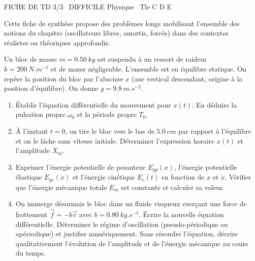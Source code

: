 \documentclass[11pt]{article}
\begin{document}
\begin{tcolorbox}[enhanced,colback=popink,colframe=popink,arc=10pt,boxrule=0pt,left=12pt,right=12pt,top=9pt,bottom=9pt]
{\color{white}\popxbold\small FICHE DE TD 3/3 \textbullet\ DIFFICILE \hfill Physique \textbullet\ Tle C D E\par}
\end{tcolorbox}
\vspace{4pt}
\noindent Cette fiche de synthèse propose des problèmes longs mobilisant l'ensemble des notions du chapitre (oscillateurs libres, amortis, forcés) dans des contextes réalistes ou théoriques approfondis.

\begin{exercice}
Un bloc de masse $m = \SI{0,50}{kg}$ est suspendu à un ressort de raideur $k = \SI{200}{N.m^{-1}}$ et de masse négligeable. L'ensemble est en équilibre statique. On repère la position du bloc par l'abscisse $x$ (axe vertical descendant, origine à la position d'équilibre). On donne $g = \SI{9,8}{m.s^{-2}}$.
\begin{enumerate}
    \item Établir l'équation différentielle du mouvement pour $x(t)$. En déduire la pulsation propre $\omega_0$ et la période propre $T_0$.
    \item À l'instant $t=0$, on tire le bloc vers le bas de $\SI{5,0}{cm}$ par rapport à l'équilibre et on le lâche sans vitesse initiale. Déterminer l'expression horaire $x(t)$ et l'amplitude $X_m$.
    \item Exprimer l'énergie potentielle de pesanteur $E_{pp}(x)$, l'énergie potentielle élastique $E_{pe}(x)$ et l'énergie cinétique $E_c(t)$ en fonction de $x$ et $\dot{x}$. Vérifier que l'énergie mécanique totale $E_m$ est constante et calculer sa valeur.
    \item On immerge désormais le bloc dans un fluide visqueux exerçant une force de frottement $\vec{f} = -b\vec{v}$ avec $b = \SI{0,80}{kg.s^{-1}}$. Écrire la nouvelle équation différentielle. Déterminer le régime d'oscillation (pseudo-périodique ou apériodique) et justifier numériquement. Sans résoudre l'équation, décrire qualitativement l'évolution de l'amplitude et de l'énergie mécanique au cours du temps.
\end{enumerate}
\end{exercice}
\end{document}
